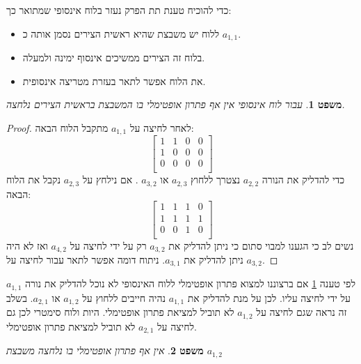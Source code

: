 \documentclass[12pt,leqno]{article}
\theoremstyle{theoremdd}
\newtheorem{theorem}{משפט}[section]
\begin{document}
כדי להוכיח טענת תת הפרק נעזר בלוח אינסופי שמתואר כך:
\begin{itemize}
    \item 
    ללוח יש משבצת שהיא ראשית הצירים 
    נסמן אותה כ 
    $a_{1,1}$.
    \item 
    בלוח זה הצירים ממשיכים אינסוף ימינה ולמעלה.
    \item 
    את הלוח אפשר לתאר בעזרת מטריצה אינסופית.
\end{itemize}

\begin{theorem}
    \label{thm:cant-press-a11}
    עבור לוח אינסופי
    אין אף פתרון 
    אופטימלי בו המשבצת בראשית הצירים נלחצה.
\end{theorem}
\begin{proof}
    לאחר לחיצה על 
    $a_{1,1}$
    מתקבל הלוח הבאה:
    \[
        \begin{bmatrix}
            1 & 1 & 0 & 0 \\
            1 & 0 & 0 & 0 \\
            0 & 0 & 0 & 0 \\
        \end{bmatrix}
    \]
    כדי להדליק 
    את הנורה
    $a_{2,2}$
    נצטרך 
    ללחוץ
    $a_{2,3}$
    או 
    $a_{3,2}$
    .
    אם נילחץ על
   $a_{2,3}$
   נקבל את הלוח הבאה:
   \[
        \begin{bmatrix}
            1 & 1 & 1 & 0 \\
            1 & 1 & 1 & 1 \\
            0 & 0 & 1 & 0 \\
        \end{bmatrix}
    \]
    נשים לב כי הגענו למבוי סתום כי
    ניתן להדליק את 
    $a_{3,2}$
    רק על ידי לחיצה על 
   $a_{4,2}$ 
   ואז לא היה ניתן להדליק את 
   $a_{3,1}$.
   ניתוח דומה אפשר לתאר עבור 
   לחיצה על 
   $a_{3,2}$.
\end{proof}
לפי טענה
\ref{thm:cant-press-a11}
אם ברצוננו למצוא פתרון אופטימלי ללוח האינסופי לא נוכל 
להדליק את נורה 
$a_{1,1}$
על ידי לחיצה עליו.
לכן על מנת להדליק את 
$a_{1,1}$
נהיה חייבים ללחוץ על 
$a_{1,2}$
או 
$a_{2,1}$.
בשלב זה נראה שגם לחיצה על 
$a_{1,2}$
לא תוביל למציאת פתרון אופטימלי.
היות ולוח סימטרי לכן גם
לחיצה על 
$a_{2,1}$
לא תוביל למציאת פתרון אופטימלי.
\begin{theorem}
    \label{thm:cant-press-a12}
    אין אף פתרון 
    אופטימלי בו נלחצה 
    משבצת
    $a_{1,2}$
\end{theorem}
\end{document}
